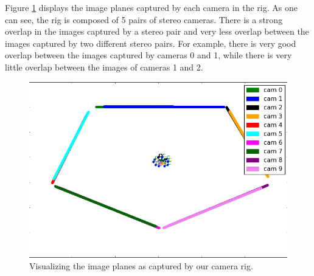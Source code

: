 \documentclass[10pt,twocolumn,letterpaper]{article}
\begin{document}
Figure \ref{fig:imageplanes} displays the image planes captured by each camera in the rig. As one can see, the rig is composed of 5 pairs of stereo cameras. There is a strong overlap in the images captured by a stereo pair and very less overlap between the images captured by two different stereo pairs. For example, there is very good overlap between the images captured by cameras 0 and 1, while there is very little overlap between the images of cameras 1 and 2. 
\begin{figure}[t]
\begin{center}
   \includegraphics[width=0.7\linewidth]{pictures/rig_detailed.png}
\end{center}
   \caption{Visualizing the image planes as captured by our camera rig.}
\label{fig:imageplanes}
\end{figure}
\end{document}
